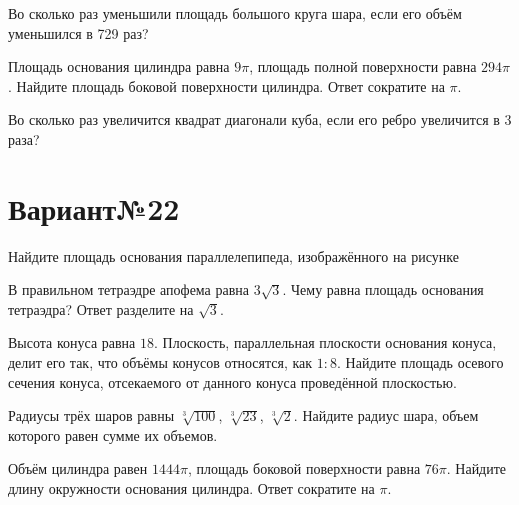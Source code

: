 \documentclass[4apaper]{article}
\begin{document}
\begin{taskBN}{4}
Во сколько раз уменьшили площадь большого круга шара, если его объём уменьшился в 729 раз?
\end{taskBN}

\begin{taskBN}{5}
Площадь основания цилиндра равна $9\pi$, площадь полной поверхности равна $294\pi$. Найдите площадь боковой поверхности цилиндра. Ответ сократите на $\pi$.
\end{taskBN}

\begin{taskBN}{6}
Во сколько раз увеличится квадрат диагонали куба, если его ребро увеличится в 3 раза?
\end{taskBN}
\newpage\section*{Вариант№22}

\begin{taskBN}{1}
Найдите площадь основания параллелепипеда, изображённого на рисунке
\end{taskBN}

\begin{taskBN}{2}
В правильном тетраэдре апофема равна $3\sqrt{3}$. Чему равна площадь основания тетраэдра? Ответ разделите на $\sqrt{3}$.
\end{taskBN}

\begin{taskBN}{3}
Высота конуса равна $18$. Плоскость, параллельная плоскости основания конуса,  делит его так, что объёмы конусов относятся, как $1:8$. Найдите площадь осевого сечения конуса, отсекаемого от данного конуса проведённой плоскостью. 
\end{taskBN}

\begin{taskBN}{4}
Радиусы трёх шаров равны $\sqrt[3]{100}$, $\sqrt[3]{23}$, $\sqrt[3]{2}$. Найдите радиус шара, объем которого равен сумме их объемов.
\end{taskBN}

\begin{taskBN}{5}
Объём цилиндра равен $1444\pi$, площадь боковой поверхности равна $76\pi$. Найдите длину окружности основания цилиндра. Ответ сократите на $\pi$.
\end{taskBN}
\end{document}
